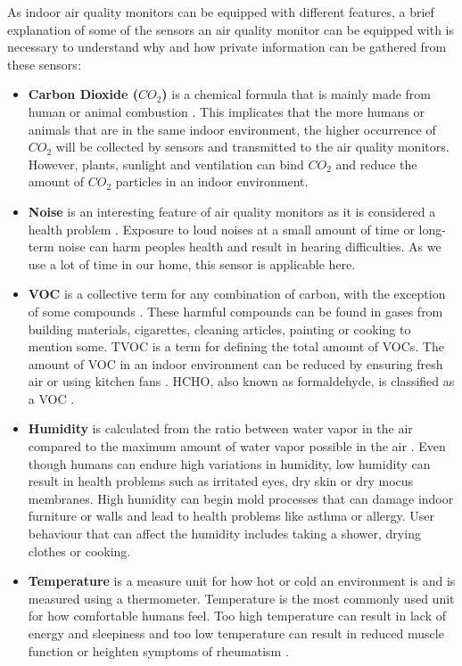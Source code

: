 As indoor air quality monitors can be equipped with different features, a brief explanation of some of the sensors an air quality monitor can be equipped with is necessary to understand why and how private information can be gathered from these sensors:
\begin{itemize}
    \item \textbf{Carbon Dioxide (\(CO_2\))} is a chemical formula that is mainly made from human or animal combustion \cite{CO2}. This implicates that the more humans or animals that are in the same indoor environment, the higher occurrence of \(CO_2\) will be collected by sensors and transmitted to the air quality monitors. However, plants, sunlight and ventilation can bind \(CO_2\) and reduce the amount of \(CO_2\) particles in an indoor environment.
    \item \textbf{Noise} is an interesting feature of air quality monitors as it is considered a health problem \cite{Noise}. Exposure to loud noises at a small amount of time or long-term noise can harm peoples health and result in hearing difficulties. As we use a lot of time in our home, this sensor is applicable here. 
    \item \textbf{\gls{VOC}} is a collective term for any combination of carbon, with the exception of some compounds \cite{VOC}. These harmful compounds can be found in gases from building materials, cigarettes, cleaning articles, painting or cooking to mention some. \gls{TVOC} is a term for defining the total amount of \gls{VOC}s. The amount of \gls{VOC} in an indoor environment can be reduced by ensuring fresh air or using kitchen fans \cite{RecommendedIAQ}. HCHO, also known as formaldehyde, is classified as a \gls{VOC} \cite{HCHO}.
    \item \textbf{Humidity} is calculated from the ratio between water vapor in the air compared to the maximum amount of water vapor possible in the air \cite{RecommendedIAQ}. Even though humans can endure high variations in humidity, low humidity can result in health problems such as irritated eyes, dry skin or dry mocus membranes. High humidity can begin mold processes that can damage indoor furniture or walls and lead to health problems like asthma or allergy. User behaviour that can affect the humidity includes taking a shower, drying clothes or cooking. 
    \item \textbf{Temperature} is a measure unit for how hot or cold an environment is and is measured using a thermometer. Temperature is the most commonly used unit for how comfortable humans feel. Too high temperature can result in lack of energy and sleepiness and too low temperature can result in reduced muscle function or heighten symptoms of rheumatism \cite{Temp}.
\end{itemize}

